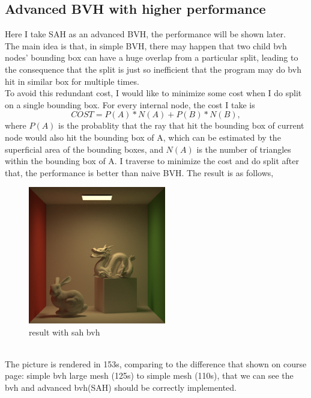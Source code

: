 \documentclass[acmtog]{acmart}
\begin{document}
\subsection{Advanced BVH with higher performance}
Here I take SAH as an advanced BVH, the performance will be shown later.\\
The main idea is that, in simple BVH, there may happen that two child bvh nodes' bounding box can have a huge overlap from a particular split, leading to the consequence that the split is just so inefficient that the program may do bvh hit in similar box for multiple times.\\
To avoid this redundant cost, I would like to minimize some cost when I do split on a single bounding box. For every internal node, the cost I take is
$$COST = P(A)*N(A) + P(B)*N(B),$$
where $P(A)$ is the probablity that the ray that hit the bounding box of current node would also hit the bounding box of A, which can be estimated by the superficial area of the bounding boxes, and $N(A)$ is the number of triangles within the bounding box of A. I traverse to minimize the cost and do split after that, the performance is better than naive BVH.
The result is as follows,
\begin{figure}[h]
	\includegraphics[width=6.0cm,height=6.0cm]{bvh_large.png}
	\caption{result with sah bvh}
\end{figure}\\
The picture is rendered in 153s, comparing to the difference that shown on course page: simple bvh large mesh (125s) to simple mesh (110s), that we can see the bvh and advanced bvh(SAH) should be correctly implemented.
\end{document}

